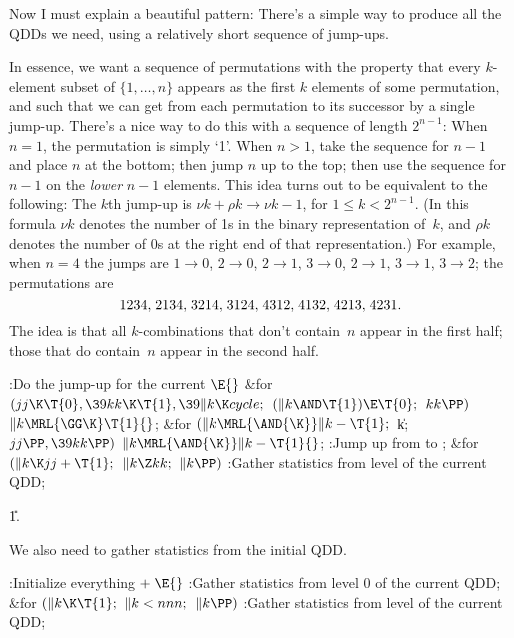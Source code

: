Now I must explain a beautiful pattern: There's a simple way to produce
all the QDDs we need, using a relatively short sequence of jump-ups.

In essence, we want a sequence of permutations with the
property that every $k$-element subset of $\{1,\ldots,n\}$ appears
as the first $k$ elements of some permutation, and such that we can
get from each permutation to its successor by a single jump-up.
There's a nice way to do this with a sequence of length $2^{n-1}$:
When $n=1$, the permutation is simply `1'. When $n>1$, take the
sequence for $n-1$ and place $n$ at the bottom; then jump $n$ up
to the top; then use the sequence for $n-1$ on the {\it lower\/}
$n-1$ elements. This idea turns out to be equivalent to the following:
The $k$th jump-up is $\nu k+\rho k\to\nu k-1$, for $1\le k<2^{n-1}$.
(In this formula
$\nu k$ denotes the number of 1s in the binary representation of~$k$,
and $\rho k$ denotes the number of 0s at the right end of that representation.)
For example, when $n=4$ the jumps are $1\to0$, $2\to0$, $2\to1$, $3\to0$,
$2\to1$, $3\to1$, $3\to2$; the permutations are
$$\thinmuskip=\thickmuskip
1234,2134,3214,3124,4312,4132,4213,4231.$$
The idea is that all $k$-combinations that don't contain~$n$ appear
in the first half; those that do contain~$n$ appear in the second half.

\Y\B\4:Do the jump-up for the current \X${}\E{}$\6
\&{for} ${}(\\{jj}\K\T{0},\39\\{kk}\K\T{1},\39\|k\K\\{cycle};{}$ ${}(\|k\AND%
\T{1})\E\T{0};{}$ ${}\\{kk}\PP){}$\1\5
${}\|k\MRL{{\GG}{\K}}\T{1}{}$;\2\6
\&{for} ${}(\|k\MRL{\AND{\K}}\|k-\T{1};{}$ \|k; ${}\\{jj}\PP,\39\\{kk}\PP){}$\1%
\5
${}\|k\MRL{\AND{\K}}\|k-\T{1}{}$;\2\6
:Jump up from  to \X;\6
\&{for} ${}(\|k\K\\{jj}+\T{1};{}$ ${}\|k\Z\\{kk};{}$ ${}\|k\PP){}$\1\5
:Gather statistics from level  of the current QDD\X;\2\par
\U1.\fi

We also need to gather statistics from the initial QDD.

\Y\B\4:Initialize everything\X${}\mathrel+\E{}$\6
:Gather statistics from level 0 of the current QDD\X;\6
\&{for} ${}(\|k\K\T{1};{}$ ${}\|k<\\{nnn};{}$ ${}\|k\PP){}$\1\5
:Gather statistics from level  of the current QDD\X;\2\par
\fi

